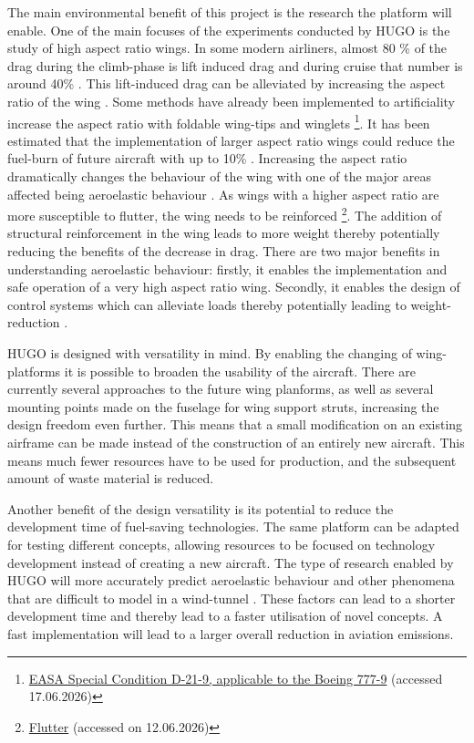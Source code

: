 The main environmental benefit of this project is the research the platform will enable. One of the main focuses of the experiments conducted by HUGO is the study of high aspect ratio wings. In some modern airliners, almost 80 \% of the drag  during the climb-phase is lift induced drag and during cruise that number is around 40\% \cite{MA2024100983}. This lift-induced drag can be alleviated by increasing the aspect ratio of the wing \cite{MA2024100983}. Some methods have already been implemented to artificiality increase the aspect ratio with foldable wing-tips and winglets \footnote{\href{https://www.easa.europa.eu/sites/default/files/dfu/Consultation\%20-\%20SC\%20D-21-9\%20-\%20FINAL.PDF}{EASA Special Condition D-21-9, applicable to the Boeing 777-9} (accessed 17.06.2026)}. It has been estimated that the implementation of larger aspect ratio wings could reduce the fuel-burn of future aircraft with up to 10\% \cite{MA2024100983} . Increasing the aspect ratio dramatically changes the behaviour of the wing with one of the major areas affected being aeroelastic behaviour \cite{AFONSO201740}. As wings with a higher aspect ratio are more susceptible to flutter, the wing needs to be reinforced \footnote{\href{https://www.dlr.de/en/ae/latest/technical-articles/preliminary-aeroelastic-stability-assessment-of-high-aspect-ratio-wing-aircraft}{Flutter} (accessed on 12.06.2026)}.
The addition of structural reinforcement in the wing leads to more weight thereby potentially reducing the benefits of the decrease in drag.   
There are two major benefits in understanding aeroelastic behaviour: firstly, it enables the implementation and safe operation of a very high aspect ratio wing. Secondly, it enables the design of control systems which can alleviate loads thereby potentially leading to weight-reduction \cite{AN202048}.  

HUGO is designed with versatility in mind. By enabling the changing of wing-platforms it is possible to broaden the usability of the aircraft. There are currently several approaches to the future wing planforms, as well as several mounting points made on the fuselage for wing support struts, increasing the design freedom even further. This means that a small modification on an existing airframe can be made instead of the construction of an entirely new aircraft. This means much fewer resources have to be used for production, and the subsequent amount of waste material is reduced.   

Another benefit of the design versatility is its potential to reduce the development time of fuel-saving technologies. The same platform can be adapted for testing different concepts, allowing resources to be focused on technology development instead of creating a new aircraft.  The type of research enabled by HUGO will more accurately predict aeroelastic behaviour and other phenomena that are difficult to model in a wind-tunnel \cite{Stenfelt2015}. These factors can lead to a shorter development time and thereby lead to a faster utilisation of novel concepts. A fast implementation will lead to a larger overall reduction in aviation emissions.  

